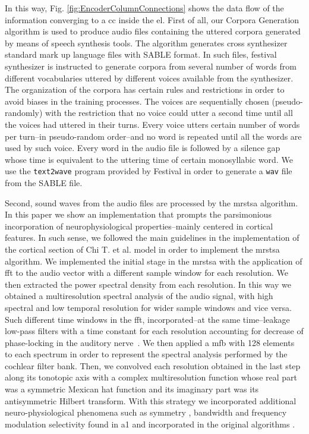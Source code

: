 {In this way, Fig. \ref{fig:EncoderColumnConnections} shows the data flow of the information converging to a \gls{cc} inside the \gls{el}. First of all, our Corpora Generation algorithm is used to produce audio files containing the uttered corpora generated by means of speech synthesis tools. The algorithm generates cross synthesizer standard mark up language files with SABLE \cite{sable} format. In such files, \gls{festival} synthesizer is instructed to generate corpora from several number of words from different vocabularies uttered by different voices available from the synthesizer. The organization of the corpora has certain rules and restrictions in order to avoid biases in the training processes. The voices are sequentially chosen (pseudo-randomly) with the restriction that no voice could utter a second time until all the voices had uttered in their turns. Every voice utters certain number of words per turn--in pseudo-random order--and no word is repeated until all the words are used by such voice. Every word in the audio file is followed by a silence gap whose time is equivalent to the uttering time of certain monosyllabic word. We use the \texttt{text2wave} program provided by Festival in order to generate a \texttt{wav} file from the SABLE file.

Second, sound waves from the audio files are processed by the \gls{mrstsa} algorithm. In this paper we show an implementation that prompts the parsimonious incorporation of neurophysiological properties--mainly centered in cortical features. In such sense, we followed the main guidelines in the implementation of the cortical section of Chi T. et al. \cite{chi_2005} model in order to implement the \gls{mrstsa} algorithm. We implemented the initial stage in the \gls{mrstsa} with the application of \gls{fft} to the audio vector with a different sample window for each resolution. We then extracted the power spectral density from each resolution. In this way we obtained a multiresolution spectral analysis of the audio signal, with high spectral and low temporal resolution for wider sample windows and vice versa. Such different time windows in the \gls{fft}, incorporated--at the same time--leakage low-pass filters with a time constant for each resolution accounting for decrease of phase-locking in the auditory nerve~\cite{chi_2005}. We then applied a \gls{mfb} with 128 elements to each spectrum in order to represent the spectral analysis performed by the cochlear filter bank. Then, we convolved each resolution obtained in the last step along its tonotopic axis with a complex multiresolution function whose real part was a symmetric Mexican hat function and its imaginary part was its antisymmetric Hilbert transform. With this strategy we incorporated additional neuro-physiological phenomena such as symmetry \cite{shamma_1993}, bandwidth \cite{schreiner_1990} and frequency modulation selectivity \cite{shamma_1993,heil_1992,mendelson_1985} found in \gls{a1} and incorporated in the original algorithms \cite{wang_1995}.

}
